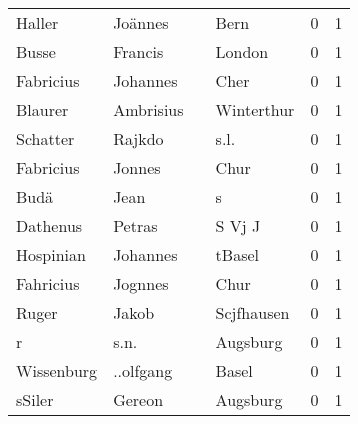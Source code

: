 \begin{tabular}{llllrr}
                   Haller &                            Joännes &             &                                        Bern &          0 &         1 \\
                    Busse &                            Francis &             &                                      London &          0 &         1 \\
                Fabricius &                           Johannes &             &                                        Cher &          0 &         1 \\
                  Blaurer &                          Ambrisius &             &                                  Winterthur &          0 &         1 \\
                 Schatter &                             Rajkdo &             &                                        s.l. &          0 &         1 \\
                Fabricius &                             Jonnes &             &                                        Chur &          0 &         1 \\
                     Budä &                               Jean &             &                                           s &          0 &         1 \\
                 Dathenus &                             Petras &             &                                      S Vj J &          0 &         1 \\
                Hospinian &                           Johannes &             &                                      tBasel &          0 &         1 \\
                Fahricius &                            Jognnes &             &                                        Chur &          0 &         1 \\
                    Ruger &                              Jakob &             &                                  Scjfhausen &          0 &         1 \\
                        r &                               s.n. &             &                                    Augsburg &          0 &         1 \\
               Wissenburg &                          ..olfgang &             &                                       Basel &          0 &         1 \\
                   sSiler &                             Gereon &             &                                    Augsburg &          0 &         1 \\

\end{tabular}

